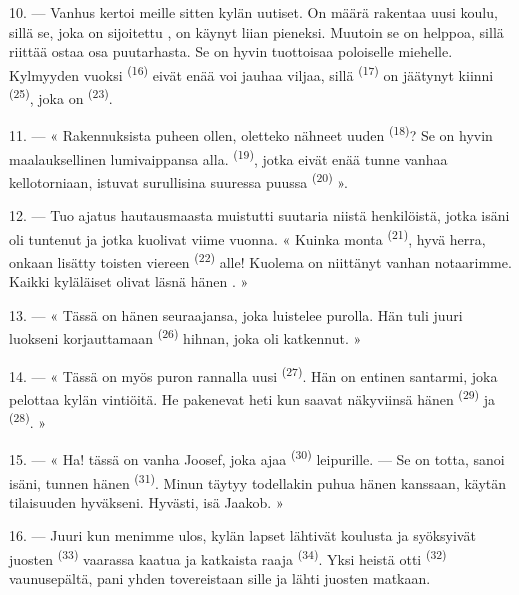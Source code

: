 \VUsaut{3.0mm}
\VUsaut{3.0mm}

10. --- Vanhus kertoi meille sitten kylän uutiset. On määrä rakentaa uusi koulu,
sillä se, joka on sijoitettu , on käynyt liian pieneksi.
Muutoin se on helppoa, sillä riittää ostaa osa  puutarhasta. Se
on hyvin tuottoisaa poloiselle miehelle. Kylmyyden vuoksi 
\textsuperscript{(16)}  eivät enää voi jauhaa viljaa, sillä
 \textsuperscript{(17)} on jäätynyt kiinni 
\textsuperscript{(25)}, joka on  \textsuperscript{(23)}.

11. --- « Rakennuksista puheen ollen, oletteko nähneet uuden 
\textsuperscript{(18)}? Se on hyvin maalauksellinen lumivaippansa alla.
 \textsuperscript{(19)}, jotka eivät enää tunne vanhaa
kellotorniaan, istuvat surullisina suuressa puussa 
\textsuperscript{(20)} ».

12. --- Tuo ajatus hautausmaasta muistutti suutaria niistä henkilöistä, jotka
isäni oli tuntenut ja jotka kuolivat viime vuonna. « Kuinka monta 
\textsuperscript{(21)}, hyvä herra, onkaan lisätty toisten viereen
 \textsuperscript{(22)} alle! Kuolema on niittänyt vanhan
notaarimme. Kaikki kyläläiset olivat läsnä hänen . »

13. --- « Tässä on hänen seuraajansa, joka luistelee purolla. Hän tuli juuri
luokseni korjauttamaan  \textsuperscript{(26)} hihnan, joka
oli katkennut. »

14. --- « Tässä on myös puron rannalla uusi 
\textsuperscript{(27)}. Hän on entinen santarmi, joka pelottaa kylän vintiöitä.
He pakenevat heti kun saavat näkyviinsä hänen 
\textsuperscript{(29)} ja  \textsuperscript{(28)}. »

15. --- « Ha! tässä on vanha Joosef, joka ajaa 
\textsuperscript{(30)} leipurille. --- Se on totta, sanoi isäni, tunnen hänen
 \textsuperscript{(31)}. Minun täytyy todellakin puhua
hänen kanssaan, käytän tilaisuuden hyväkseni. Hyvästi, isä Jaakob. »

16. --- Juuri kun menimme ulos, kylän lapset lähtivät koulusta ja syöksyivät
juosten  \textsuperscript{(33)} vaarassa kaatua ja
katkaista raaja  \textsuperscript{(34)}. Yksi heistä otti
 \textsuperscript{(32)} vaunusepältä, pani yhden tovereistaan
sille ja lähti juosten matkaan.

